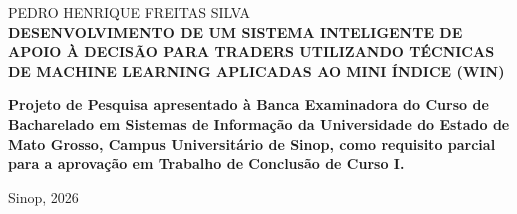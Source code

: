 \begin{center}

    {\small PEDRO HENRIQUE FREITAS SILVA\\}
    \vspace{6cm}
    {\small \textbf{DESENVOLVIMENTO DE UM SISTEMA INTELIGENTE DE APOIO À DECISÃO PARA TRADERS UTILIZANDO TÉCNICAS DE MACHINE LEARNING APLICADAS AO MINI ÍNDICE (WIN)}\\}
    \vspace{1cm}
    \hspace{.45\linewidth}
    \begin{minipage}{.50\linewidth}

        \small \textbf{Projeto de Pesquisa apresentado à Banca Examinadora do Curso de Bacharelado em Sistemas de Informação da Universidade do Estado de Mato Grosso, Campus Universitário de Sinop, como requisito parcial para a aprovação em Trabalho de Conclusão de Curso I.} \\


    \end{minipage}

    \vspace{2cm}
    \vfill
    {\small Sinop, 2026}
\end{center}

